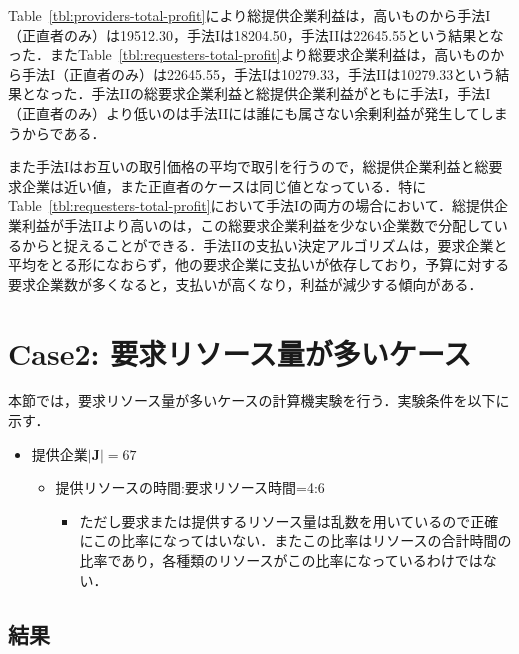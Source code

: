 Table~\ref{tbl:providers-total-profit}により総提供企業利益は，高いものから手法I（正直者のみ）は19512.30，手法Iは18204.50，手法IIは22645.55という結果となった．またTable~\ref{tbl:requesters-total-profit}より総要求企業利益は，高いものから手法I（正直者のみ）は22645.55，手法Iは10279.33，手法IIは10279.33という結果となった．手法IIの総要求企業利益と総提供企業利益がともに手法I，手法I（正直者のみ）より低いのは手法IIには誰にも属さない余剰利益が発生してしまうからである．

また手法Iはお互いの取引価格の平均で取引を行うので，総提供企業利益と総要求企業は近い値，また正直者のケースは同じ値となっている．特にTable~\ref{tbl:requesters-total-profit}において手法Iの両方の場合において．総提供企業利益が手法IIより高いのは，この総要求企業利益を少ない企業数で分配しているからと捉えることができる．手法IIの支払い決定アルゴリズムは，要求企業と平均をとる形になおらず，他の要求企業に支払いが依存しており，予算に対する要求企業数が多くなると，支払いが高くなり，利益が減少する傾向がある．

\hypertarget{case2-ux8981ux6c42ux30eaux30bdux30fcux30b9ux91cfux304cux591aux3044ux30b1ux30fcux30b9}{%
\section{Case2:
要求リソース量が多いケース}\label{case2-ux8981ux6c42ux30eaux30bdux30fcux30b9ux91cfux304cux591aux3044ux30b1ux30fcux30b9}}

本節では，要求リソース量が多いケースの計算機実験を行う．実験条件を以下に示す．

\begin{itemize}
\tightlist
\item
  提供企業\(|\boldsymbol{J}|=67\)

  \begin{itemize}
  \tightlist
  \item
    提供リソースの時間:要求リソース時間=4:6

    \begin{itemize}
    \tightlist
    \item
      ただし要求または提供するリソース量は乱数を用いているので正確にこの比率になってはいない．またこの比率はリソースの合計時間の比率であり，各種類のリソースがこの比率になっているわけではない．
    \end{itemize}
  \end{itemize}
\end{itemize}

\hypertarget{ux7d50ux679c-2}{%
\subsection{結果}\label{ux7d50ux679c-2}}


